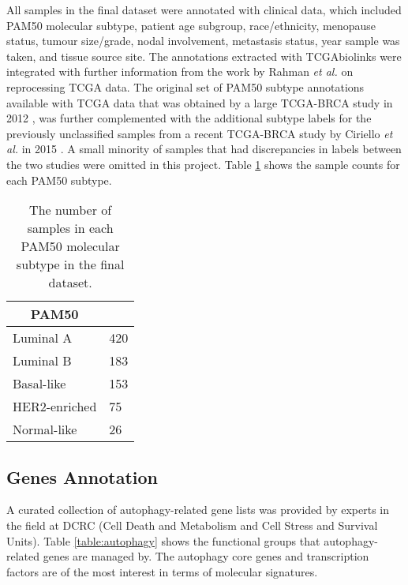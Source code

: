  

    All samples in the final dataset were annotated with clinical data, which included PAM50 molecular subtype, patient age subgroup, race/ethnicity, menopause status, tumour size/grade, nodal involvement, metastasis status, year sample was taken, and tissue source site. The annotations extracted with TCGAbiolinks were integrated with further information from the work by Rahman \textit{et al. }\cite{Rahman2015AlternativeResults} on reprocessing TCGA data. 
    The original set of PAM50 subtype annotations available with TCGA data that was obtained by a large TCGA-BRCA study in 2012 \cite{TCGAResearchNetwork2012}, was further complemented with the additional subtype labels for the previously unclassified samples from a recent TCGA-BRCA study by Ciriello \textit{et al.} in 2015 \cite{Ciriello2015ComprehensiveCancer}. A small minority of samples that had discrepancies in labels between the two studies were omitted in this project.  Table \ref{table:pam50counts} shows the sample counts for each PAM50 subtype. 
    
    
                \begin{table}[!htbp]
                \centering
                \caption[PAM50 samples count in the dataset]{The number of samples in each PAM50 molecular subtype in the final dataset.}
                \label{table:pam50counts}
                \begin{tabular}{ll}
                \multicolumn{1}{c}{\textbf{PAM50}} &  \\ \hline
                \multicolumn{1}{|l|}{Luminal A} & \multicolumn{1}{l|}{420} \\ \hline
                \multicolumn{1}{|l|}{Luminal B} & \multicolumn{1}{l|}{183} \\ \hline
                \multicolumn{1}{|l|}{Basal-like} & \multicolumn{1}{l|}{153} \\ \hline
                \multicolumn{1}{|l|}{HER2-enriched} & \multicolumn{1}{l|}{75} \\ \hline
                \multicolumn{1}{|l|}{Normal-like} & \multicolumn{1}{l|}{26} \\ \hline
                \end{tabular}
                \end{table}
                

    \subsection{Genes Annotation}   
    A curated collection of autophagy-related gene lists was provided by experts in the field at DCRC (Cell Death and Metabolism and Cell Stress and Survival Units). Table \ref{table:autophagy} shows the functional groups that autophagy-related genes are managed by. The autophagy core genes and transcription factors are of the most interest in terms of molecular signatures. 
    
